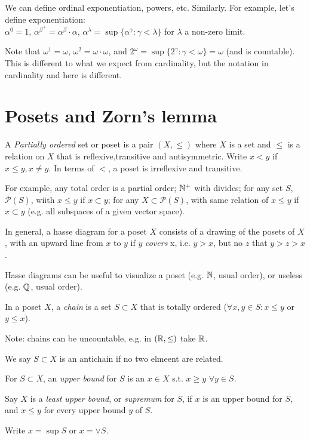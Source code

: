 \documentclass[a4paper]{article}
\begin{document}
We can define ordinal exponentiation, powers, etc. Similarly. For example, let's define exponentiation:\\
$\alpha^0 = 1$, $\alpha^{\beta^+} = \alpha^\beta \cdot \alpha$, $\alpha^\lambda = \sup\{\alpha^\gamma:\gamma<\lambda\}$ for $\lambda$ a non-zero limit.

Note that $\omega^1 = \omega$, $\omega^2 = \omega \cdot \omega$, and $2^\omega = \sup\{2^\gamma: \gamma<\omega\} = \omega$ (and is countable). This is different to what we expect from cardinality, but the notation in cardinality and here is different.

\newpage

\section{Posets and Zorn's lemma}
A \emph{Partially ordered} set or {poset} is a pair $(X,\leq)$ where $X$ is a set and $\leq$ is a relation on $X$ that is reflexive,transitive and antisymmetric. Write $x<y$ if $x\leq y ,x \neq y$. In terms of $<$, a poset is irreflexive and transitive.

For example, any total order is a partial order; $\mathbb{N}^+$ with divides; for any set $S$, $\mathcal{P}(S)$, wiith $x \leq y$ if $x \subset y$; for any $X \subset \mathcal{P}(S)$, with same relation of $x \leq y$ if $x \subset y$ (e.g. all subspaces of a given vector space).

In general, a hasse diagram for a poset $X$ consists of a drawing of the posets of $X$, with an upward line from $x$ to $y$ if $y$ \emph{covers} x, i.e. $y>x$, but no $z$ that $y>z>x$.

Hasse diagrams can be useful to visualize a poset (e.g. $\mathbb{N}$, usual order), or useless (e.g. $\mathbb{Q}$, usual order).

In a poset $X$, a \emph{chain} is a set $S \subset X$ that is totally ordered ($\forall x,y\in S: x \leq y$ or $y \leq x$). 

Note: chains can be uncountable, e.g. in $(\mathbb{R},\leq)$ take $\mathbb{R}$.

We say $S \subset X$ is an antichain if no two elmeent are related.

For $S \subset X$, an \emph{upper bound} for $S$ is an $x \in X$ s.t. $x \geq y$ $\forall y \in S$.

Say $X$ is a \emph{least upper bound}, or \emph{supremum} for $S$, if $x$ is an upper bound for $S$, and $x \leq y$ for every upper bound $y$ of $S$.

Write $x = \sup S$ or $x = \vee S$.
\end{document}

